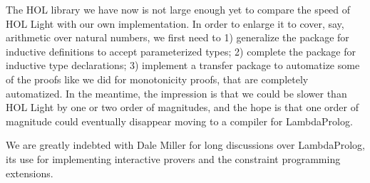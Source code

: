 \documentclass[preprint]{sigplanconf}
\begin{document}
The HOL library we have now is not large enough yet to compare the speed of HOL Light with our own implementation. In order to enlarge it to cover, say, arithmetic over natural numbers, we first need to 1) generalize the package for inductive definitions to accept parameterized types; 2) complete the package for inductive type declarations; 3) implement a transfer package to automatize some of the proofs like we did for monotonicity proofs, that are completely automatized. In the meantime, the impression is that we could be slower than HOL Light by one or two order of magnitudes, and the hope is that one order of magnitude could eventually disappear moving to a compiler for LambdaProlog.




\acks

We are greatly indebted with Dale Miller for long discussions over LambdaProlog, its use for implementing interactive provers and the constraint programming extensions.



\end{document}

